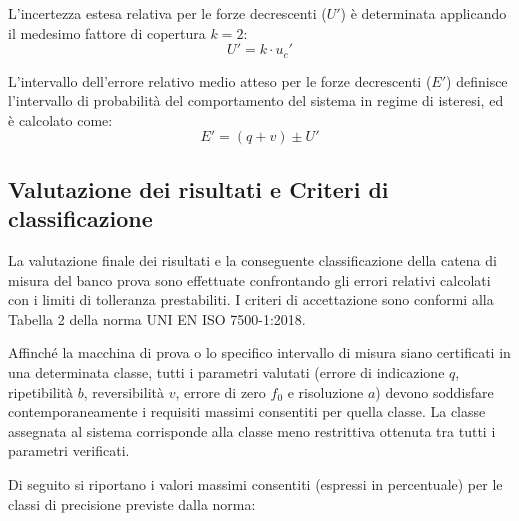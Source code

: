 \documentclass[a4paper, twoside]{article}
\begin{document}
L'incertezza estesa relativa per le forze decrescenti ($U'$) è determinata applicando il medesimo fattore di copertura $k=2$:
\begin{equation}
    U' = k \cdot u_c'
\end{equation}

L'intervallo dell'errore relativo medio atteso per le forze decrescenti ($E'$) definisce l'intervallo di probabilità del comportamento del sistema in regime di isteresi, ed è calcolato come:
\begin{equation}
    E' = (q + v) \pm U'
\end{equation}

\subsection{Valutazione dei risultati e Criteri di classificazione}
La valutazione finale dei risultati e la conseguente classificazione della catena di misura del banco prova sono effettuate confrontando gli errori relativi calcolati con i limiti di tolleranza prestabiliti. I criteri di accettazione sono conformi alla Tabella 2 della norma UNI EN ISO 7500-1:2018.

Affinché la macchina di prova o lo specifico intervallo di misura siano certificati in una determinata classe, tutti i parametri valutati (errore di indicazione $q$, ripetibilità $b$, reversibilità $v$, errore di zero $f_0$ e risoluzione $a$) devono soddisfare contemporaneamente i requisiti massimi consentiti per quella classe. La classe assegnata al sistema corrisponde alla classe meno restrittiva ottenuta tra tutti i parametri verificati.

Di seguito si riportano i valori massimi consentiti (espressi in percentuale) per le classi di precisione previste dalla norma:

\begin{table}[H]
    \centering
    \renewcommand{\arraystretch}{1.3}
    \caption{Valori massimi consentiti per le caratteristiche del sistema di misurazione della forza (ISO 7500-1:2018, Tabella 2).}
    \label{tab:classificazione_iso}
\end{table}
\end{document}
